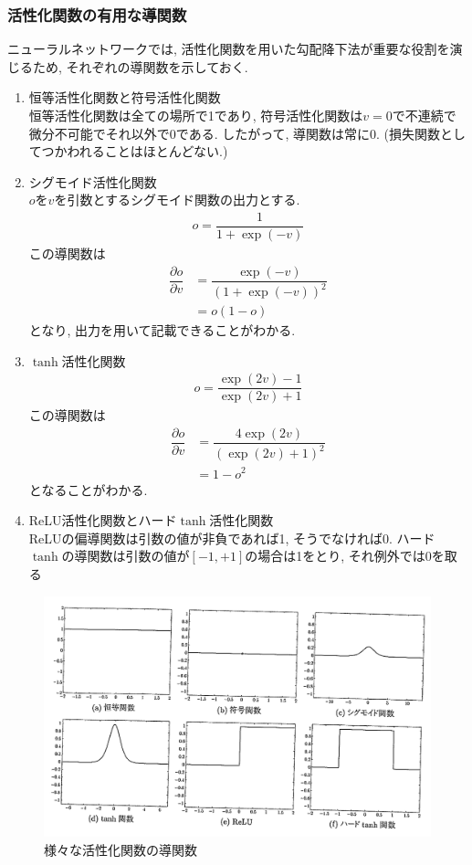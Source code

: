 \documentclass[dvipdfmx,report,11pt]{jsbook}
\begin{document}
\subsubsection{活性化関数の有用な導関数}
ニューラルネットワークでは, 活性化関数を用いた勾配降下法が重要な役割を演じるため, それぞれの導関数を示しておく.
\begin{enumerate}
  \item 恒等活性化関数と符号活性化関数\\
  恒等活性化関数は全ての場所で1であり, 符号活性化関数は$v=0$で不連続で微分不可能でそれ以外で0である. したがって, 導関数は常に0. (損失関数としてつかわれることはほとんどない.)
  \item シグモイド活性化関数\\
  $o$を$v$を引数とするシグモイド関数の出力とする.
  \begin{align}
    o=\dfrac{1}{1+\exp(-v)}
  \end{align}
  この導関数は
  \begin{align}
    \dfrac{\partial o}{\partial v}&=\dfrac{\exp(-v)}{(1+\exp(-v))^2}\\
    &=o(1-o)
  \end{align}
  となり, 出力を用いて記載できることがわかる.
  \item $\tanh$活性化関数\\
  \begin{align}
    o=\dfrac{\exp(2v)-1}{\exp(2v)+1}
  \end{align}
  この導関数は
  \begin{align}
    \dfrac{\partial o}{\partial v}&=\dfrac{4\exp(2v)}{(\exp(2v)+1)^2}\\
    &=1-o^2
  \end{align}
  となることがわかる.
  \item ReLU活性化関数とハード$\tanh$活性化関数\\
  ReLUの偏導関数は引数の値が非負であれば1, そうでなければ0. ハード$\tanh$の導関数は引数の値が$[-1,+1]$の場合は1をとり, それ例外では0を取る
\end{enumerate}
\begin{figure}[H]
  \centering
    \includegraphics[width=0.7\linewidth]{figure/fig10.png}
    \caption{様々な活性化関数の導関数}
    \label{fig10}
\end{figure}
\end{document}
